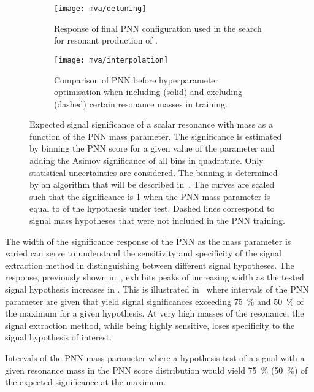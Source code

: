 \begin{figure}[htbp]
  \centering

  \begin{subfigure}[t]{.49\textwidth}
    \texttt{[image: mva/detuning]}
    \caption{Response of final PNN configuration used in the search
      for resonant production of \HH.}
    \label{fig:pnn_detuning}
  \end{subfigure}\hfill%
  \begin{subfigure}[t]{.49\textwidth}
    \centering
    \texttt{[image: mva/interpolation]}
    \caption{Comparison of PNN before hyperparameter optimisation when
      including (solid) and excluding (dashed) certain resonance
      masses in training.}
    \label{fig:pnn_interpolation}
  \end{subfigure}

  \caption{Expected signal significance of a scalar resonance with
    mass \mX as a function of the PNN mass parameter. The significance
    is estimated by binning the PNN score for a given value of the
    parameter and adding the Asimov significance of all bins in
    quadrature. Only statistical uncertainties are considered. The
    binning is determined by an algorithm that will be described
    in~. The curves are scaled such that the
    significance is 1 when the PNN mass parameter is equal to \mX of
    the hypothesis under test. Dashed lines correspond to signal mass
    hypotheses that were not included in the PNN training.}
  \label{fig:pnn_properties}
\end{figure}

The width of the significance response of the PNN as the mass
parameter is varied can serve to understand the sensitivity and
specificity of the signal extraction method in distinguishing between
different signal hypotheses. The response, previously shown
in~, exhibits peaks of increasing width as the
tested signal hypothesis increases in \mX. This is illustrated
in~ where intervals of the PNN parameter are given
that yield signal significances exceeding \SI{75}{\percent} and
\SI{50}{\percent} of the maximum for a given hypothesis. At very high
masses of the resonance, the signal extraction method, while being
highly sensitive, loses specificity to the signal hypothesis of
interest.

\begin{table}[htbp]
  \centering

  \caption{Intervals of the PNN mass parameter where a hypothesis test
    of a signal with a given resonance mass in the PNN score
    distribution would yield \SI{75}{\percent} (\SI{50}{\percent}) of
    the expected significance at the maximum.}%
  \label{tab:pnn_width}

  
\end{table}

